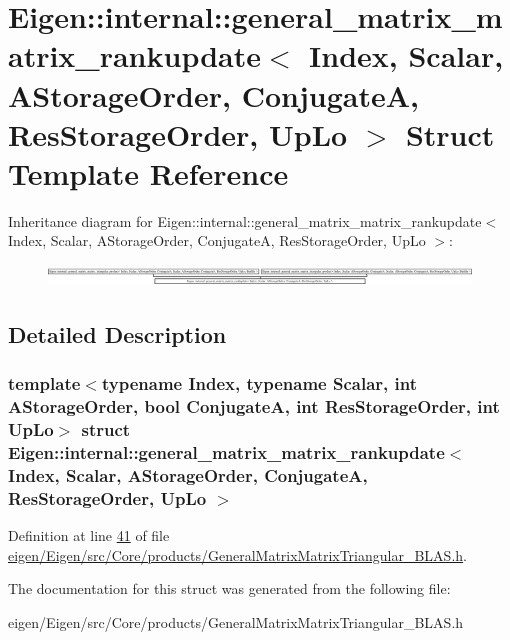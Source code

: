 \hypertarget{struct_eigen_1_1internal_1_1general__matrix__matrix__rankupdate}{}\section{Eigen\+:\+:internal\+:\+:general\+\_\+matrix\+\_\+matrix\+\_\+rankupdate$<$ Index, Scalar, A\+Storage\+Order, ConjugateA, Res\+Storage\+Order, Up\+Lo $>$ Struct Template Reference}
\label{struct_eigen_1_1internal_1_1general__matrix__matrix__rankupdate}
Inheritance diagram for Eigen\+:\+:internal\+:\+:general\+\_\+matrix\+\_\+matrix\+\_\+rankupdate$<$ Index, Scalar, A\+Storage\+Order, ConjugateA, Res\+Storage\+Order, Up\+Lo $>$\+:\begin{figure}[H]
\begin{center}
\leavevmode
\includegraphics[height=0.550639cm]{struct_eigen_1_1internal_1_1general__matrix__matrix__rankupdate}
\end{center}
\end{figure}


\subsection{Detailed Description}
\subsubsection*{template$<$typename Index, typename Scalar, int A\+Storage\+Order, bool ConjugateA, int Res\+Storage\+Order, int Up\+Lo$>$\newline
struct Eigen\+::internal\+::general\+\_\+matrix\+\_\+matrix\+\_\+rankupdate$<$ Index, Scalar, A\+Storage\+Order, Conjugate\+A, Res\+Storage\+Order, Up\+Lo $>$}



Definition at line \hyperlink{eigen_2_eigen_2src_2_core_2products_2_general_matrix_matrix_triangular___b_l_a_s_8h_source_l00041}{41} of file \hyperlink{eigen_2_eigen_2src_2_core_2products_2_general_matrix_matrix_triangular___b_l_a_s_8h_source}{eigen/\+Eigen/src/\+Core/products/\+General\+Matrix\+Matrix\+Triangular\+\_\+\+B\+L\+A\+S.\+h}.



The documentation for this struct was generated from the following file\+:\begin{DoxyCompactItemize}
\item 
eigen/\+Eigen/src/\+Core/products/\+General\+Matrix\+Matrix\+Triangular\+\_\+\+B\+L\+A\+S.\+h\end{DoxyCompactItemize}
